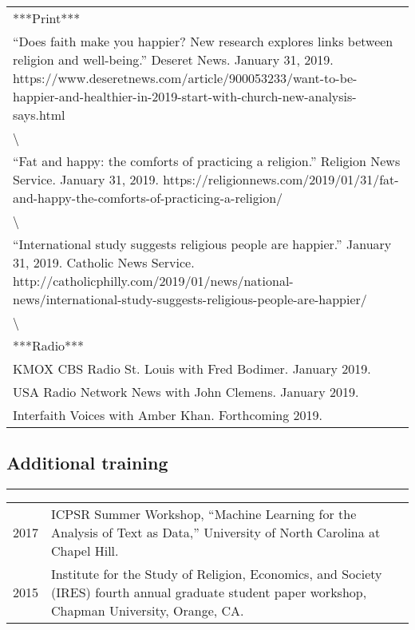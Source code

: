 \documentclass[
]{article}
\begin{document}
\begin{tabular}{l}
\hline
\\
\hline
***Print***\\
\hline
“Does faith make you happier? New research explores links between religion and well-being.” Deseret News. January 31, 2019. https://www.deseretnews.com/article/900053233/want-to-be-happier-and-healthier-in-2019-start-with-church-new-analysis-says.html\\
\hline
\textbackslash{}\\
\hline
“Fat and happy: the comforts of practicing a religion.” Religion News Service. January 31, 2019. https://religionnews.com/2019/01/31/fat-and-happy-the-comforts-of-practicing-a-religion/\\
\hline
\textbackslash{}\\
\hline
“International study suggests religious people are happier.” January 31, 2019. Catholic News Service. http://catholicphilly.com/2019/01/news/national-news/international-study-suggests-religious-people-are-happier/\\
\hline
\textbackslash{}\\
\hline
***Radio***\\
\hline
KMOX CBS Radio St. Louis with Fred Bodimer. January 2019.\\
\hline
USA Radio Network News with John Clemens. January 2019.\\
\hline
Interfaith Voices with Amber Khan. Forthcoming 2019.\\
\hline
\end{tabular}

\hypertarget{additional-training}{%
\subsection{Additional training}\label{additional-training}}

\begin{center}\rule{0.5\linewidth}{\linethickness}\end{center}

\begin{tabular}{>{}r|>{\raggedright\arraybackslash}p{50em}}
\hline
 & \\
\hline
2017 & ICPSR Summer Workshop, “Machine Learning for the Analysis of Text as Data,” University of North Carolina at Chapel Hill.\\
\hline
2015 & Institute for the Study of Religion, Economics, and Society (IRES) fourth annual graduate student paper workshop, Chapman University, Orange, CA.\\
\hline
\end{tabular}
\end{document}
